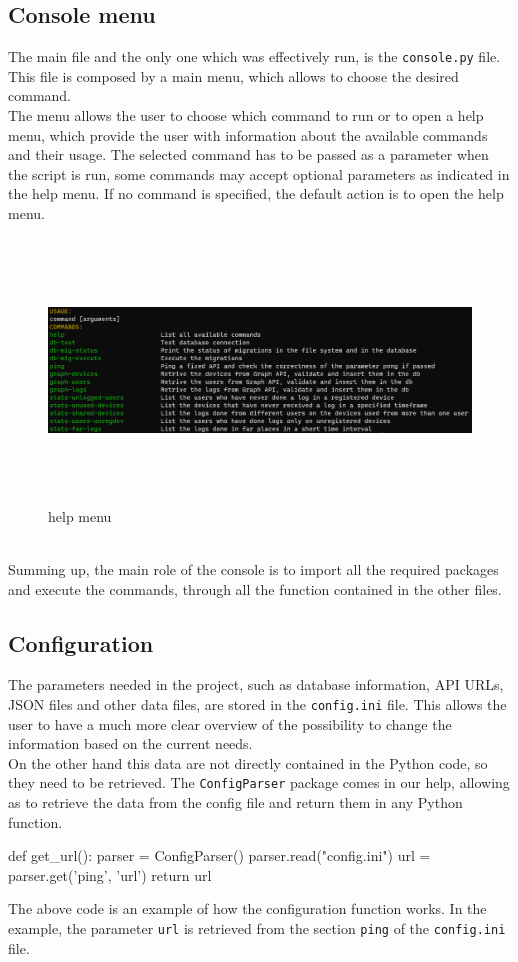 \documentclass[12pt, a4paper, oneside]{article}
\begin{document}
\subsection{Console menu}
The main file and the only one which was effectively run, is the \texttt{console.py} file. This file is composed by a main menu, which allows to choose the desired command.\\
The menu allows the user to choose which command to run or to open a help menu, which provide the user with information about the available commands and their usage. The selected command has to be passed as a
parameter when the script is run, some commands may accept optional parameters as indicated in the help menu. If no command is specified, the default action is to open the help menu.
\begin{figure}[h]
    \centering
    \includegraphics[width=\textwidth, height=7cm]{help-menu.png}
    \caption{help menu}
\end{figure}\\
Summing up, the main role of the console is to import all the required packages and execute the commands, through all the function contained in the other files.

\subsection{Configuration}
The parameters needed in the project, such as database information, API URLs, JSON files and other data files, are stored in the \texttt{config.ini} file. This allows the user to have a much more clear
overview of the possibility to change the information based on the current needs.\\
On the other hand this data are not directly contained in the Python code, so they need to be retrieved. The \texttt{ConfigParser} package comes in our help, allowing as to retrieve the data from the config file
and return them in any Python function.
\begin{python}
    def get_url():
        parser = ConfigParser()
        parser.read("config.ini")
        url = parser.get('ping', 'url')
        return url
\end{python}
The above code is an example of how the configuration function works. In the example, the parameter \texttt{url} is retrieved from the section \texttt{ping} of the \texttt{config.ini} file.
\end{document}
